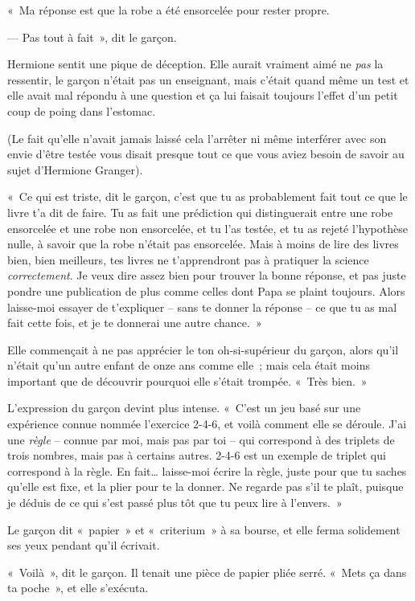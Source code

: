 «~Ma réponse est que la robe a été ensorcelée pour rester propre.

--- Pas tout à fait~», dit le garçon.

Hermione sentit une pique de déception. Elle aurait vraiment aimé ne \emph{pas} la ressentir, le garçon n'était pas un enseignant, mais c'était quand même un test et elle avait mal répondu à une question et ça lui faisait toujours l'effet d'un petit coup de poing dans l'estomac.

(Le fait qu'elle n'avait jamais laissé cela l'arrêter ni même interférer avec son envie d'être testée vous disait presque tout ce que vous aviez besoin de savoir au sujet d'Hermione Granger).

«~Ce qui est triste, dit le garçon, c'est que tu as probablement fait tout ce que le livre t'a dit de faire. Tu as fait une prédiction qui distinguerait entre une robe ensorcelée et une robe non ensorcelée, et tu l'as testée, et tu as rejeté l'hypothèse nulle, à savoir que la robe n'était pas ensorcelée. Mais à moins de lire des livres bien, bien meilleurs, tes livres ne t'apprendront pas à pratiquer la science \emph{correctement}. Je veux dire assez bien pour trouver la bonne réponse, et pas juste pondre une publication de plus comme celles dont Papa se plaint toujours. Alors laisse-moi essayer de t'expliquer -- sans te donner la réponse -- ce que tu as mal fait cette fois, et je te donnerai une autre chance.~»

Elle commençait à ne pas apprécier le ton oh-si-supérieur du garçon, alors qu'il n'était qu'un autre enfant de onze ans comme elle~; mais cela était moins important que de découvrir pourquoi elle s'était trompée. «~Très bien.~»

L'expression du garçon devint plus intense. «~C'est un jeu basé sur une expérience connue nommée l'exercice 2-4-6, et voilà comment elle se déroule. J'ai une \emph{règle} -- connue par moi, mais pas par toi -- qui correspond à des triplets de trois nombres, mais pas à certains autres. 2-4-6 est un exemple de triplet qui correspond à la règle. En fait… laisse-moi écrire la règle, juste pour que tu saches qu'elle est fixe, et la plier pour te la donner. Ne regarde pas s'il te plaît, puisque je déduis de ce qui s'est passé plus tôt que tu peux lire à l'envers.~»

Le garçon dit «~papier~» et «~criterium~» à sa bourse, et elle ferma solidement ses yeux pendant qu'il écrivait.

«~Voilà~», dit le garçon. Il tenait une pièce de papier pliée serré. «~Mets ça dans ta poche~», et elle s'exécuta.

